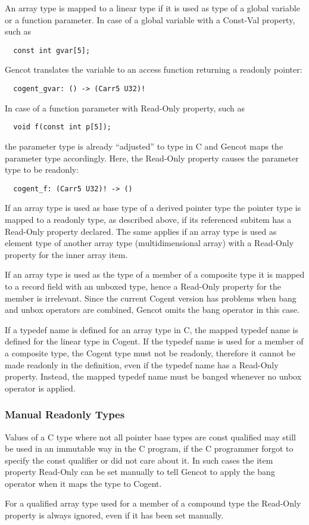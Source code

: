 An array type is mapped to a linear type if it is used as type of a global variable or a function parameter. In case of
a global variable with a Const-Val property, such as
\begin{verbatim}
  const int gvar[5];
\end{verbatim}
Gencot translates the variable to an access function returning a readonly pointer:
\begin{verbatim}
  cogent_gvar: () -> (Carr5 U32)!
\end{verbatim}
In case of a function parameter with Read-Only property, such as
\begin{verbatim}
  void f(const int p[5]);
\end{verbatim}
the parameter type is already ``adjusted'' to type  in C and Gencot maps the parameter type 
accordingly. Here, the Read-Only property causes the parameter type to be readonly:
\begin{verbatim}
  cogent_f: (Carr5 U32)! -> ()
\end{verbatim}

If an array type is used as base type of a derived pointer type the pointer
type is mapped to a readonly type, as described above, if its referenced subitem has a Read-Only property declared.
The same applies if an array type is used as element type of another array type (multidimensional array) with
a Read-Only property for the inner array item.

If an array type is used as the type of a member of a composite type it is mapped to a record field with an unboxed type,
hence a Read-Only property for the member is irrelevant. Since the current Cogent version has problems when bang and unbox operators
are combined, Gencot omits the bang operator in this case. 

If a typedef name is defined for an array type in C, the mapped typedef name is defined for the linear type in Cogent. 
If the typedef name is used for a member of a composite type, the Cogent type must not be readonly, therefore it
cannot be made readonly in the definition, even if the typedef name has a Read-Only property.
Instead, the mapped typedef name must be banged whenever no unbox operator is applied. 

\subsubsection{Manual Readonly Types}

Values of a C type where not all pointer base types are const qualified may still be used in an immutable way in the 
C program, if the C programmer forgot to specify the const qualifier or did not care about it. In such cases the item
property Read-Only can be set manually to tell Gencot to apply the bang operator when it maps the type to Cogent.

For a  qualified array type used for a member of a compound type the Read-Only property is always ignored,
even if it has been set manually.

